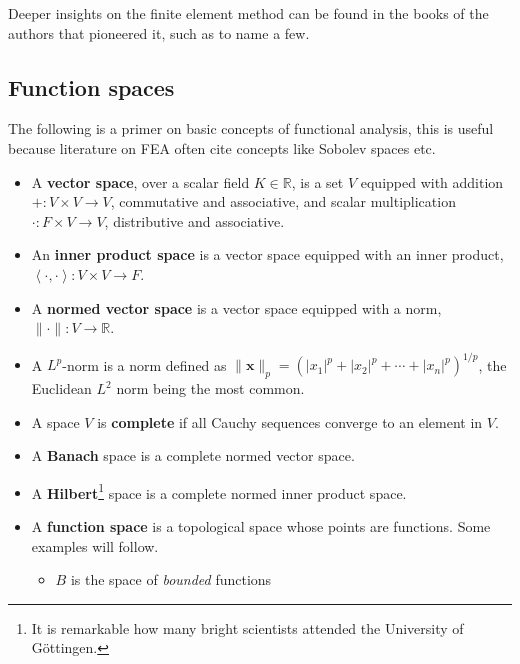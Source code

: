 \documentclass{digitaldynamics}
\def\vect#1{\bm{#1}}
\begin{document}
Deeper insights on the finite element method can be found in the books of the authors that pioneered it, such as \cite{zienkiewiczFEA1977,tjrhughes87,bathe1982,wriggers2006} to name a few.


\subsection{Function spaces}

The following is a primer on basic concepts of functional analysis, this is useful because literature on FEA often cite concepts like Sobolev spaces etc.

\begin{itemize}
	\item A \textbf{vector space}, over a scalar field $K \in \mathbb{R}$, is a set $V$ equipped with 
	addition $+: V \times V \rightarrow V$, commutative and associative, 
	and scalar multiplication $\cdot: F \times V \rightarrow V$, distributive and associative.
	
	\item An \textbf{inner product space} is a vector space equipped with an inner product, $\left\langle\cdot,\cdot\right\rangle : V \times V \rightarrow F$.
	
	\item A \textbf{normed vector space} is a vector space equipped with a norm, $\| \cdot \| : V \rightarrow \mathbb{R}$.
	
	\item A $L^p$-norm is a norm defined as $\| \vect{x} \|_p = \left( |x_1|^p + |x_2|^p + \dotsb + |x_n|^p \right) ^{1/p}$, the Euclidean $L^2$ norm being the most common.
	
	\item A space $V$ is \textbf{complete} if all Cauchy sequences converge to an element in $V$.
	
	\item A \textbf{Banach} space is a complete normed vector space.
	
	\item A \textbf{Hilbert}\footnote{It is remarkable how many bright scientists attended the University of Göttingen.} space is a complete normed inner product space.
	
	\item A \textbf{function space} is a topological space whose points are functions. Some examples will follow.
	
	
	
	\begin{itemize}
		\item $B$ is the space of \textit{bounded} functions
		

\end{itemize}
\end{itemize}
\end{document}
